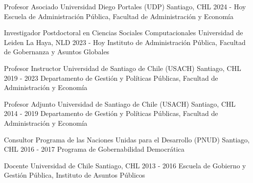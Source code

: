 





\begin{cventries}
\cventry
{Profesor Asociado} 
{Universidad Diego Portales (UDP)} 
{Santiago, CHL} 
{2024 - Hoy}
{Escuela de Administración Pública, Facultad de Administración y Economía} \vspace{1.5mm}

\cventry
{Investigador Postdoctoral en Ciencias Sociales Computacionales} 
{Universidad de Leiden} 
{La Haya, NLD} 
{2023 - Hoy}
{Instituto de Administración Pública, Facultad de Gobernanza y Asuntos Globales} \vspace{1.5mm}
\end{cventries}


\begin{cventries}
\cventry
{Profesor Instructor} 
{Universidad de Santiago de Chile (USACH)} 
{Santiago, CHL} 
{2019 - 2023}
{Departamento de Gestión y Políticas Públicas, Facultad de Administración y Economía}\vspace{1.5mm}

\cventry
{Profesor Adjunto} 
{Universidad de Santiago de Chile (USACH)} 
{Santiago, CHL} 
{2014 - 2019}
{Departamento de Gestión y Políticas Públicas, Facultad de Administración y Economía}\vspace{1.5mm}

\cventry
{Consultor} 
{Programa de las Naciones Unidas para el Desarrollo (PNUD)} 
{Santiago, CHL} 
{2016 - 2017}
{Programa de Gobernabilidad Democrática} \vspace{1.5mm}

\cventry
{Docente} 
{Universidad de Chile} 
{Santiago, CHL} 
{2013 - 2016}
{Escuela de Gobierno y Gestión Pública, Instituto de Asuntos Públicos}\vspace{1.5mm}
\end{cventries}
